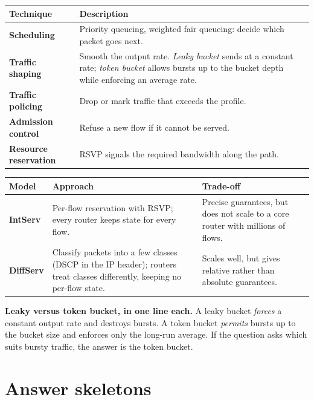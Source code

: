\documentclass[11pt,a4paper]{article}
\begin{document}
\begin{center}\small
\begin{tabularx}{\textwidth}{>{\bfseries}p{} X}
\toprule Technique & Description\\
\midrule
Scheduling & Priority queueing, weighted fair queueing: decide which packet goes next.\\
Traffic shaping & Smooth the output rate. \emph{Leaky bucket} sends at a constant rate; \emph{token bucket} allows bursts up to the bucket depth while enforcing an average rate.\\
Traffic policing & Drop or mark traffic that exceeds the profile.\\
Admission control & Refuse a new flow if it cannot be served.\\
Resource reservation & RSVP signals the required bandwidth along the path.\\
\bottomrule
\end{tabularx}
\end{center}

\begin{center}\small
\begin{tabularx}{\textwidth}{>{\bfseries}p{} X X}
\toprule Model & Approach & Trade-off\\
\midrule
IntServ & Per-flow reservation with RSVP; every router keeps state for every flow. & Precise guarantees, but does not scale to a core router with millions of flows.\\
DiffServ & Classify packets into a few classes (DSCP in the IP header); routers treat classes differently, keeping no per-flow state. & Scales well, but gives relative rather than absolute guarantees.\\
\bottomrule
\end{tabularx}
\end{center}

\begin{exambox}
\textbf{Leaky versus token bucket, in one line each.} A leaky bucket \emph{forces} a constant output rate and destroys bursts. A token bucket \emph{permits} bursts up to the bucket size and enforces only the long-run average. If the question asks which suits bursty traffic, the answer is the token bucket.
\end{exambox}

\section{Answer skeletons}
\end{document}
